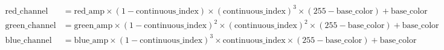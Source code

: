 \documentclass[preview, border=10pt]{standalone}
\newcommand*\widefbox[1]{\fbox{\hspace{2em}#1\hspace{2em}}}
\begin{document}
\abovedisplayskip=-3pt
\begin{align*}
\text{red\_channel} &= \text{red\_amp} \times (1 - \text{continuous\_index}) \times (\text{continuous\_index})^3 \times (255 - \text{base\_color}) + \text{base\_color} \\
\text{green\_channel} &= \text{green\_amp} \times (1 - \text{continuous\_index})^2 \times (\text{continuous\_index})^2 \times (255 - \text{base\_color}) + \text{base\_color} \\
\text{blue\_channel} &= \text{blue\_amp} \times (1 - \text{continuous\_index})^3 \times \text{continuous\_index} \times (255 - \text{base\_color}) + \text{base\_color}
\end{align*}
\end{document}
